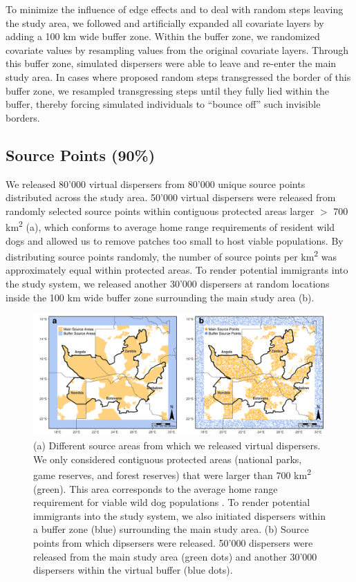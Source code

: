 \documentclass[abstract=on,10pt,a4paper,bibliography=totocnumbered]{article}
\begin{document}
To minimize the influence of edge effects and to deal with random steps leaving
the study area, we followed \citep{Koen.2010} and artificially expanded all
covariate layers by adding a 100 km wide buffer zone. Within the buffer zone, we
randomized covariate values by resampling values from the original covariate
layers. Through this buffer zone, simulated dispersers were able to leave and
re-enter the main study area. In cases where proposed random steps transgressed
the border of this buffer zone, we resampled transgressing steps until they
fully lied within the buffer, thereby forcing simulated individuals to ``bounce
off'' such invisible borders.

\subsection{Source Points (90\%)}
We released 80'000 virtual dispersers from 80'000 unique source points
distributed across the study area. 50'000 virtual dispersers were released from
randomly selected source points within contiguous protected areas larger \(>\)
700 km\textsuperscript{2} (a), which conforms to average home
range requirements of resident wild dogs \citep{Pomilia.2015} and allowed us to
remove patches too small to host viable populations. By distributing source
points randomly, the number of source points per km\textsuperscript{2} was
approximately equal within protected areas. To render potential immigrants into
the study system, we released another 30'000 dispersers at random locations
inside the 100 km wide buffer zone surrounding the main study area
(b).

\begin{figure}[htbp]
  \begin{center}
    \includegraphics[width = \textwidth]{99_SourceAreas.png}
    \caption{(a) Different source areas from which we released virtual
    dispersers. We only considered contiguous protected areas (national parks,
    game reserves, and forest reserves) that were larger than 700
    km\textsuperscript{2} (green). This area corresponds to the average home
    range requirement for viable wild dog populations \citep{Pomilia.2015}. To
    render potential immigrants into the study system, we also initiated
    dispersers within a buffer zone (blue) surrounding the main study area. (b)
    Source points from which dipsersers were released. 50'000 dispersers were
    released from the main study area (green dots) and another 30'000 dispersers
    within the virtual buffer (blue dots).}
    \label{SourcePoints}
  \end{center}
\end{figure}
\end{document}

